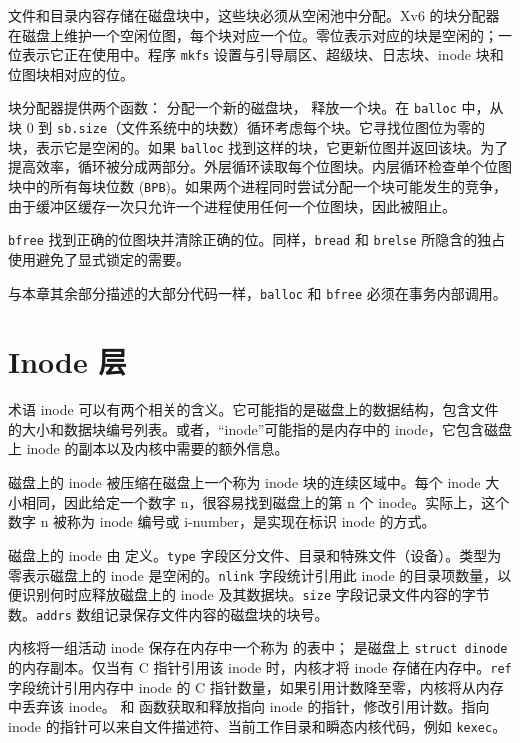 文件和目录内容存储在磁盘块中，这些块必须从空闲池中分配。Xv6 的块分配器在磁盘上维护一个空闲位图，每个块对应一个位。零位表示对应的块是空闲的；一位表示它正在使用中。程序 \lstinline{mkfs} 设置与引导扇区、超级块、日志块、inode 块和位图块相对应的位。

块分配器提供两个函数： 分配一个新的磁盘块， 释放一个块。在 \lstinline{balloc} 中，从块 0 到 \lstinline{sb.size}（文件系统中的块数）循环考虑每个块。它寻找位图位为零的块，表示它是空闲的。如果 \lstinline{balloc} 找到这样的块，它更新位图并返回该块。为了提高效率，循环被分成两部分。外层循环读取每个位图块。内层循环检查单个位图块中的所有每块位数 (\lstinline{BPB})。如果两个进程同时尝试分配一个块可能发生的竞争，由于缓冲区缓存一次只允许一个进程使用任何一个位图块，因此被阻止。

\lstinline{bfree} 找到正确的位图块并清除正确的位。同样，\lstinline{bread} 和 \lstinline{brelse} 所隐含的独占使用避免了显式锁定的需要。

与本章其余部分描述的大部分代码一样，\lstinline{balloc} 和 \lstinline{bfree} 必须在事务内部调用。
\section{Inode 层}

术语 inode 可以有两个相关的含义。它可能指的是磁盘上的数据结构，包含文件的大小和数据块编号列表。或者，“inode”可能指的是内存中的 inode，它包含磁盘上 inode 的副本以及内核中需要的额外信息。

磁盘上的 inode 被压缩在磁盘上一个称为 inode 块的连续区域中。每个 inode 大小相同，因此给定一个数字 n，很容易找到磁盘上的第 n 个 inode。实际上，这个数字 n 被称为 inode 编号或 i-number，是实现在标识 inode 的方式。

磁盘上的 inode 由  定义。\lstinline{type} 字段区分文件、目录和特殊文件（设备）。类型为零表示磁盘上的 inode 是空闲的。\lstinline{nlink} 字段统计引用此 inode 的目录项数量，以便识别何时应释放磁盘上的 inode 及其数据块。\lstinline{size} 字段记录文件内容的字节数。\lstinline{addrs} 数组记录保存文件内容的磁盘块的块号。

内核将一组活动 inode 保存在内存中一个称为  的表中； 是磁盘上 \lstinline{struct dinode} 的内存副本。仅当有 C 指针引用该 inode 时，内核才将 inode 存储在内存中。\lstinline{ref} 字段统计引用内存中 inode 的 C 指针数量，如果引用计数降至零，内核将从内存中丢弃该 inode。 和  函数获取和释放指向 inode 的指针，修改引用计数。指向 inode 的指针可以来自文件描述符、当前工作目录和瞬态内核代码，例如 \lstinline{kexec}。


